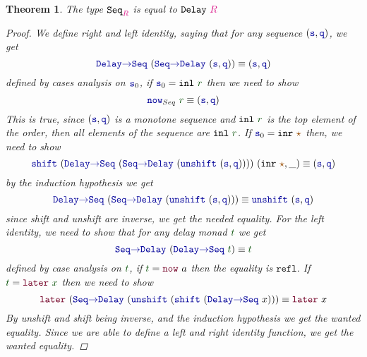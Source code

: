 \documentclass[twoside,11pt,openright]{report}
\theoremstyle{plain} %
\newtheorem{thm}{Theorem}[section]
\theoremstyle{definition}
\theoremstyle{remark}
\newcommand*{\term}[1]{\textcolor{green!30!black}{#1}} %
\newcommand*{\type}[1]{\textcolor{magenta!90!black}{#1}}
\newcommand*{\constant}[1]{\textcolor{orange!60!black}{\ensuremath{\mathtt{#1}}}}
\newcommand*{\function}[1]{\textcolor{blue!60!black}{\ensuremath{\mathtt{#1}}}}
\newcommand*{\constructor}[1]{\textcolor{purple!60!black}{\ensuremath{\mathtt{#1}}}}
\newcommand*{\typeformer}[1]{\ensuremath{\mathtt{#1}}}
\newcommand*{\unitelem}{\constant{\star}} %
\begin{document}
\begin{thm}
  The type \(\typeformer{Seq}_{\type{R}}\) is equal to \(\typeformer{Delay}~\type{R}\)
  \begin{proof}  
    We define right and left identity, saying that for any sequence \((\function{s},\function{q})\), we get
    \begin{equation}
      \function{Delay{\rightarrow}Seq}~(\function{Seq{\rightarrow}Delay}~(\function{s},\function{q})) \equiv (\function{s},\function{q})
    \end{equation}
    defined by cases analysis on \(\function{s}_0\), if \(\function{s}_0 = \mathtt{inl}~\term{r}\) then we need to show
    \begin{equation}
      \function{now}_{Seq}~\term{r} \equiv (\function{s},\function{q})
    \end{equation}
    This is true, since \((\function{s},\function{q})\) is a monotone sequence and \(\mathtt{inl}~\term{r}\) is the top element of the order, then all elements of the sequence are \(\mathtt{inl}~\term{r}\). If \(\function{s}_0 = \mathtt{inr}~\unitelem\) then, we need to show
    \begin{equation}
      \function{shift}~(\function{Delay{\rightarrow}Seq}~(\function{Seq{\rightarrow}Delay}~(\function{unshift}~(\function{s},\function{q}))))~(\mathtt{inr}~\unitelem,\_) \equiv (\function{s},\function{q})
    \end{equation}
    by the induction hypothesis we get
    \begin{equation}
      \function{Delay{\rightarrow}Seq}~(\function{Seq{\rightarrow}Delay}~(\function{unshift}~(\function{s},\function{q}))) \equiv \function{unshift}~(\function{s},\function{q})
    \end{equation}
    since shift and unshift are inverse, we get the needed equality.
    For the left identity, we need to show that for any delay monad \(\term{t}\) we get
    \begin{equation}
      \function{Seq{\rightarrow}Delay}~(\function{Delay{\rightarrow}Seq}~\term{t}) \equiv \term{t}
    \end{equation}
    defined by case analysis on \(\term{t}\), if \(\term{t} = \constructor{now}~a\) then the equality is \(\mathtt{refl}\). If \(\term{t} = \constructor{later}~\term{x}\) then we need to show
    \begin{equation}
      \constructor{later}~(\function{Seq{\rightarrow}Delay}~(\function{unshift}~(\function{shift}~(\function{Delay{\rightarrow}Seq}~x))) \equiv \constructor{later}~x
    \end{equation}
    By unshift and shift being inverse, and the induction hypothesis we get the wanted equality. Since we are able to define a left and right identity function, we get the wanted equality.
  \end{proof}
\end{thm}
\end{document}

